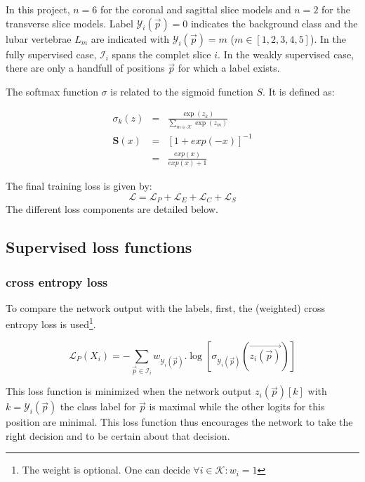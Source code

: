 In this project, $n=6$ for the coronal and sagittal slice models and $n=2$ for the transverse slice models. 
Label $\mathcal{Y}_i(\vec{p})=0$ indicates the background class and the lubar vertebrae $L_m$ are indicated with $\mathcal{Y}_i(\vec{p})=m$ ($m\in[1,2,3,4,5]$).
In the fully supervised case, $\mathcal{I}_i$ spans the complet slice $i$. In the weakly supervised case, there are only a handfull of positions $\vec{p}$ for which a label exists.

The softmax function $\sigma$ is related to the sigmoid function $S$. It is defined as:

\begin{eqnarray}
    \sigma_k(z) &=& \frac{\exp(z_k)}{\sum_{m\in\mathcal{K}} \exp(z_m)} \\
    \mathbf{S}(x) &=& \left[ 1+ exp(-x) \right]^{-1} \\ &=& \frac{exp(x)}{exp(x) + 1} 
\end{eqnarray}

The final training loss is given by:
\begin{equation}
    \mathcal{L} = \mathcal{L}_P + \mathcal{L}_E + \mathcal{L}_C + \mathcal{L}_S
\end{equation}
The different loss components are detailed below.

\subsection{Supervised loss functions}

\subsubsection{cross entropy loss\label{sec:crossentropy}}
To compare the network output with the labels, first, the (weighted) cross entropy loss is used\footnote{The weight is optional. One can decide $\forall i\in\mathcal{K}: w_i=1$}.

\begin{equation}
\mathcal{L}_P(X_i) = -\sum_{\vec{p} \in \mathcal{I}_i} w_{\mathcal{Y}_i(\vec{p})}.\log\left[\sigma_{\mathcal{Y}_i(\vec{p})}\left(\vec{z_i(\vec{p})}\right)\right]
\label{eq:LP}
\end{equation}

This loss function is minimized when the network output $z_i(\vec{p})[k]$ with $k=\mathcal{Y}_i(\vec{p})$ the class label for $\vec{p}$ is maximal while the other logits for this position are minimal.
This loss function thus encourages the network to take the right decision and to be certain about that decision.

